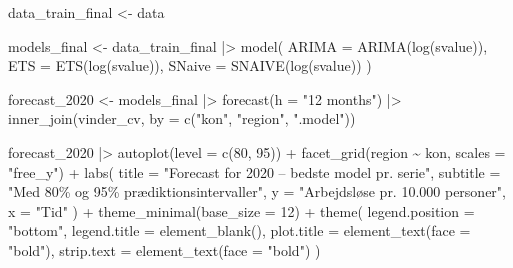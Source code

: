 \documentclass[
]{article}
\newenvironment{Shaded}{\begin{snugshade}}{\end{snugshade}}
\newcommand{\AttributeTok}[1]{\textcolor[rgb]{0.40,0.45,0.13}{#1}}
\newcommand{\DecValTok}[1]{\textcolor[rgb]{0.68,0.00,0.00}{#1}}
\newcommand{\FunctionTok}[1]{\textcolor[rgb]{0.28,0.35,0.67}{#1}}
\newcommand{\NormalTok}[1]{\textcolor[rgb]{0.00,0.23,0.31}{#1}}
\newcommand{\OtherTok}[1]{\textcolor[rgb]{0.00,0.23,0.31}{#1}}
\newcommand{\SpecialCharTok}[1]{\textcolor[rgb]{0.37,0.37,0.37}{#1}}
\newcommand{\StringTok}[1]{\textcolor[rgb]{0.13,0.47,0.30}{#1}}
\begin{document}
\begin{Shaded}
\begin{Highlighting}[]
\NormalTok{data\_train\_final }\OtherTok{\textless{}{-}}\NormalTok{ data}

\NormalTok{models\_final }\OtherTok{\textless{}{-}}\NormalTok{ data\_train\_final }\SpecialCharTok{|\textgreater{}} 
  \FunctionTok{model}\NormalTok{(}
    \AttributeTok{ARIMA  =} \FunctionTok{ARIMA}\NormalTok{(}\FunctionTok{log}\NormalTok{(svalue)),}
    \AttributeTok{ETS    =} \FunctionTok{ETS}\NormalTok{(}\FunctionTok{log}\NormalTok{(svalue)),}
    \AttributeTok{SNaive =} \FunctionTok{SNAIVE}\NormalTok{(}\FunctionTok{log}\NormalTok{(svalue))}
\NormalTok{  )}

\NormalTok{forecast\_2020 }\OtherTok{\textless{}{-}}\NormalTok{ models\_final }\SpecialCharTok{|\textgreater{}} 
  \FunctionTok{forecast}\NormalTok{(}\AttributeTok{h =} \StringTok{"12 months"}\NormalTok{) }\SpecialCharTok{|\textgreater{}} 
  \FunctionTok{inner\_join}\NormalTok{(vinder\_cv, }\AttributeTok{by =} \FunctionTok{c}\NormalTok{(}\StringTok{"kon"}\NormalTok{, }\StringTok{"region"}\NormalTok{, }\StringTok{".model"}\NormalTok{))}

\NormalTok{forecast\_2020 }\SpecialCharTok{|\textgreater{}} 
  \FunctionTok{autoplot}\NormalTok{(}\AttributeTok{level =} \FunctionTok{c}\NormalTok{(}\DecValTok{80}\NormalTok{, }\DecValTok{95}\NormalTok{)) }\SpecialCharTok{+}
  \FunctionTok{facet\_grid}\NormalTok{(region }\SpecialCharTok{\textasciitilde{}}\NormalTok{ kon, }\AttributeTok{scales =} \StringTok{"free\_y"}\NormalTok{) }\SpecialCharTok{+}
  \FunctionTok{labs}\NormalTok{(}
    \AttributeTok{title =} \StringTok{"Forecast for 2020 – bedste model pr. serie"}\NormalTok{,}
    \AttributeTok{subtitle =} \StringTok{"Med 80\% og 95\% prædiktionsintervaller"}\NormalTok{,}
    \AttributeTok{y =} \StringTok{"Arbejdsløse pr. 10.000 personer"}\NormalTok{,}
    \AttributeTok{x =} \StringTok{"Tid"}
\NormalTok{  ) }\SpecialCharTok{+}
  \FunctionTok{theme\_minimal}\NormalTok{(}\AttributeTok{base\_size =} \DecValTok{12}\NormalTok{) }\SpecialCharTok{+}
  \FunctionTok{theme}\NormalTok{(}
    \AttributeTok{legend.position =} \StringTok{"bottom"}\NormalTok{,}
    \AttributeTok{legend.title =} \FunctionTok{element\_blank}\NormalTok{(),}
    \AttributeTok{plot.title =} \FunctionTok{element\_text}\NormalTok{(}\AttributeTok{face =} \StringTok{"bold"}\NormalTok{),}
    \AttributeTok{strip.text =} \FunctionTok{element\_text}\NormalTok{(}\AttributeTok{face =} \StringTok{"bold"}\NormalTok{)}
\NormalTok{  )}
\end{Highlighting}
\end{Shaded}
\end{document}
